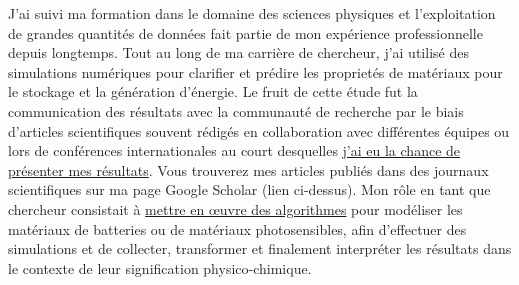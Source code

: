 \documentclass[11pt, a4paper]{awesome-cv}
\begin{document}
\begin{cvletter}
J'ai suivi ma formation dans le domaine des sciences physiques et l'exploitation de grandes quantités de données fait partie de mon expérience professionnelle 
depuis longtemps. Tout au long de ma carrière de chercheur, j'ai utilisé des simulations numériques pour clarifier et prédire les proprietés de matériaux pour 
le stockage et la génération d'énergie. Le fruit de cette étude fut la communication des résultats avec la communauté de recherche par le biais 
d'articles scientifiques souvent rédigés en collaboration avec différentes équipes ou lors de conférences internationales au court desquelles 
\underline{j'ai eu la chance de présenter mes résultats}. Vous trouverez mes articles publiés dans des journaux scientifiques sur ma page Google Scholar (lien ci-dessus).
Mon rôle en tant que chercheur consistait à \underline{mettre en œuvre des algorithmes} pour modéliser les matériaux de batteries ou de matériaux photosensibles, 
afin d'effectuer des simulations et de collecter, transformer et finalement interpréter les résultats dans le contexte de leur signification physico-chimique. 
\begin{comment}
After having surmounted the difficulties due to the advent of quartz timepieces, the Swiss watchmaking industry came out stronger than before and with Omega SA as one of its standardbearers due to the confidence that customers have in the quality of its products. Nevertheless, we live in times of rapid change and keeping an edge over the competition is more important than ever. The advent of sofisticated data infrastructures provides companies with a means to improve processes and get a better handle of operations.  
My educational background is in the physical sciences and handling large amounts of data has been part of my professional experience for a long time. Throughout my career as a research scientist I relied on the power of computers and the data that they generate in order to elucidate and predict the properties of materials for energy storage and generation. The crown achievement of this investigative process, was the communication of the results with the research community by way of scientific articles often written in collaboration with different teams or in international conferences where I presented my results. My published articles can be found on my google scholar page (link above).
My role as a researcher consisted of implementing algorithms to model battery or solar cell materials, then carrying out simulations from which data could be gathered, transformed and ultimatley interpreted within the context of its physical/chemical meaning. The final aspect, and crown achievement of this investigative process, was the communication of the results with the research community by way of scientific articles often written in collaboration with different teams or in international conferences where I presented my results. My published articles can be found on my google scholar page (link above).
\end{comment}


\end{cvletter}
\end{document}
